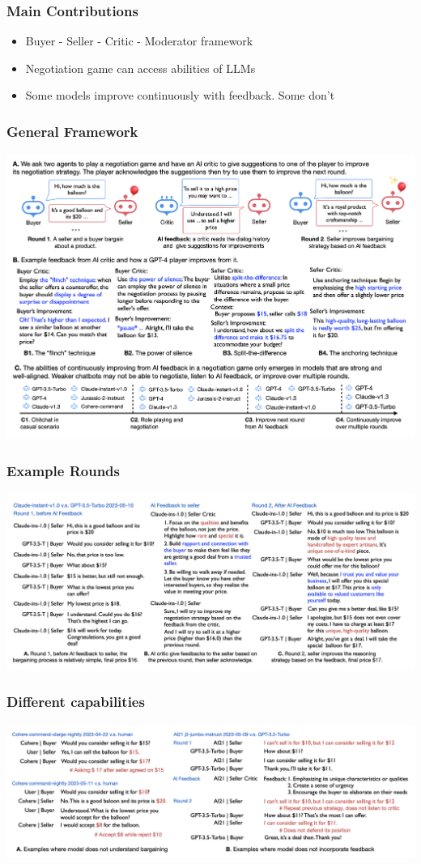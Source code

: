\documentclass[xcolor=dvipsnames]{beamer}
\newcommand{\0}{\vec{0}}
\begin{document}
\begin{frame}
	\frametitle{Main Contributions
	}
	\begin{itemize}
		\item Buyer - Seller - Critic - Moderator framework
		\item Negotiation game can access abilities of LLMs
		\item Some models improve continuously with feedback. Some don't
	\end{itemize}
\end{frame}
\begin{frame}
	\frametitle{General Framework}
	\begin{center}
		\includegraphics[scale=0.3]{Fu1}
	\end{center}
\end{frame}
\begin{frame}
	\frametitle{Example Rounds}
	\begin{center}
		\includegraphics[scale=0.3]{Fu2}
	\end{center}
\end{frame}
\begin{frame}
	\frametitle{Different capabilities}
	\begin{center}
		\includegraphics[scale=0.3]{Fu3}
	\end{center}
\end{frame}
\end{document}

